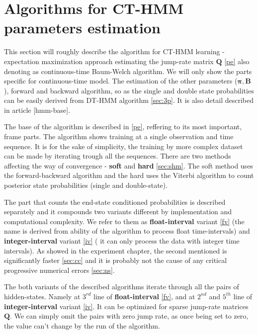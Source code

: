 \documentclass[thesis=M,english]{FITthesis}[2012/10/20]
\newcommand{\matr}[1]{\mathbf{#1}}
\begin{document}
\section{Algorithms for CT-HMM parameters estimation}\label{sec:alg}

This section will roughly describe the algorithm for CT-HMM learning - expectation maximization approach estimating the jump-rate matrix $\matr{Q}$ \ref{pe} also denoting as continuous-time Baum-Welch algorithm. We will only show the parts specific for continuous-time model. The estimation of the other parameters ($\matr{\pi},\matr{B}$), forward and backward algorithm, so as the single and double state probabilities can be easily derived from DT-HMM algorithm \ref{sec:3p}. It is also detail described in article [hmm-base].

The base of the algorithm is described in \ref{pe}, reffering to its most important, frame parts.  The algorithm shows training at a single observation and time sequence. It is for the sake of simplicity, the training by more complex dataset can be made by iterating trough all the sequences. There are two methods affecting the way of convergence - \textbf{soft} and \textbf{hard} \ref{sec:shm}. The soft method uses the forward-backward algorithm and the hard uses the Viterbi algorithm to count posterior state probabilities (single and double-state).

The part that counts the end-state conditioned probabilities is described separately and it compounds two variants different by implementation and computational complexity. We refer to them as \textbf{float-interval} variant \ref{fv} (the name is derived from ability of the algorithm to process float time-intervals) and \textbf{integer-interval} variant \ref{iv} ( it can only process the data with integer time intervals). As showed in the experiment chapter, the second mentioned is significantly faster \ref{sec:cc} and it is probably not the cause of any critical progressive numerical errors \ref{sec:ns}.

The both variants of the described algorithms iterate through all the pairs of hidden-states. Namely at $3^{rd}$ line of \textbf{float-interval} \ref{fv}, and at $2^{nd}$ and $5^{th}$ line of \textbf{integer-interval} variant \ref{iv}. It can be optimized for sparse jump-rate matrices $\matr{Q}$. We can simply omit the pairs with zero jump rate, as once being set to zero, the value can't change by the run of the algorithm.       
\end{document}
